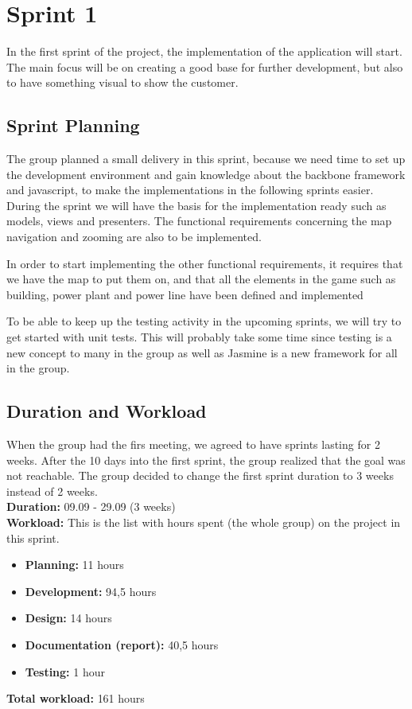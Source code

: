 \section{Sprint 1}

	In the first sprint of the project, the implementation of the application will 
	start. The main focus will be on creating a good base for further development, 
	but also to have something visual to show the customer.


\subsection{Sprint Planning}
	
	The group planned a small delivery in this sprint, because we need time to set up the 
	development environment and gain knowledge about the backbone framework and javascript, 
	to make the implementations in the following sprints easier. During the sprint we will 
	have the basis for the implementation ready such as models, views and presenters. The 
	functional requirements concerning the map navigation and zooming are also to be implemented.

	In order to start implementing the other functional requirements, it requires that we have 
	the map to put them on, and that all the elements in the game such as building, power plant 
	and power line have been defined and implemented 

	To be able to keep up the testing activity in the upcoming sprints, we will try to get started with 
	unit tests. This will probably take some time since testing is a new concept to many in the group 
	as well as Jasmine is a new framework for all in the group. 

\subsection{Duration and Workload}
	When the group had the firs meeting, we agreed to have sprints lasting for 2 weeks.
	After the 10 days into the first sprint, the group realized that the goal was not reachable.
	The group decided to change the first sprint duration to 3 weeks instead of 2 weeks. \\

	{\bf Duration:} 09.09 - 29.09 (3 weeks)\\
	{\bf Workload:} This is the list with hours spent (the whole group) on the project in this sprint.
	\begin{itemize}
		\item {\bf Planning:} 11 hours
		\item {\bf Development:} 94,5 hours
		\item {\bf Design:} 14 hours
		\item {\bf Documentation (report):} 40,5 hours
		\item {\bf Testing:} 1 hour
	\end{itemize}
	{\bf Total workload: } 161 hours \\
	
